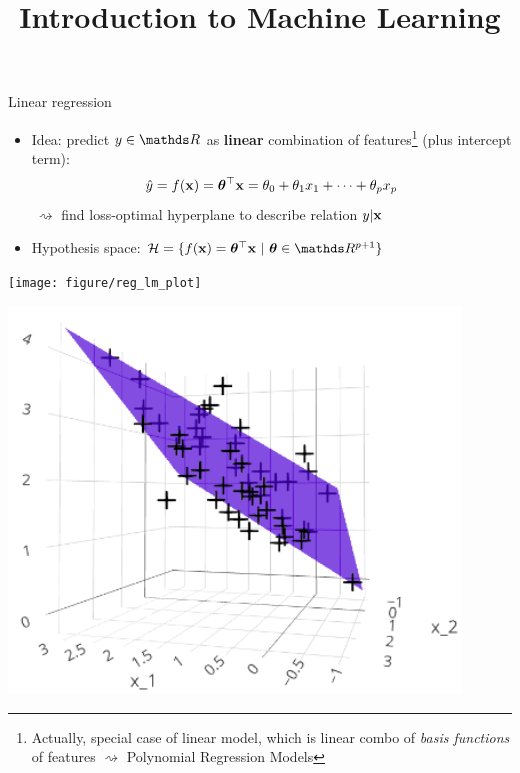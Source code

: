 \documentclass[11pt,compress,t,notes=noshow, xcolor=table]{beamer}
\title{Introduction to Machine Learning}
\institute{\href{https://compstat-lmu.github.io/lecture_i2ml/}{compstat-lmu.github.io/lecture\_i2ml}}
\date{}
\begin{document}

\begin{frame}{Linear regression}

\begin{itemize}
    \item Idea: predict $y \in \R$ as \textbf{linear} combination of 
    features\footnote[frame]{\tiny
    Actually, special case of linear model, which is linear combo of 
    \textit{basis functions} of features $\rightsquigarrow$
    Polynomial Regression Models
    }
    (plus intercept term):
    $$\hat{y} = f(\mathbf{x}) = \bm{\theta}^\top \mathbf{x} = \theta_0 + \theta_1 x_1 + \dots + \theta_p x_p$$
    $~\rightsquigarrow$ find loss-optimal hyperplane to describe relation 
    $y | \mathbf{x}$
    \item Hypothesis space: $\Hspace = \{\fx = \thx\ |\ \thetab \in \R^{p+1} \}$
    
\end{itemize}
\vfill
\begin{minipage}{0.4\textwidth}
    \texttt{[image: figure/reg\_lm\_plot]} 
\end{minipage}
\hspace{1cm}
\begin{minipage}{0.4\textwidth}
    \includegraphics[width=0.9\textwidth]{figure/ss_regr_bivariate} 
\end{minipage}

\end{frame} 

\end{document}
